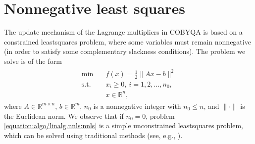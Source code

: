 \documentclass[letterpaper,10pt,english]{sphinxmanual}
\newcommand{\norm}[2][]{#1\lVert#2#1\rVert}
\def\R{\ensuremath{\mathds{R}}}
\begin{document}
\section{Nonnegative least squares}
\label{\detokenize{algo/linalg.nnls:nonnegative-least-squares}}\label{\detokenize{algo/linalg.nnls:linalg-nnls}}\label{\detokenize{algo/linalg.nnls::doc}}
\sphinxAtStartPar
The update mechanism of the Lagrange multipliers in COBYQA is based on a
constrained least\sphinxhyphen{}squares problem, where some variables must remain nonnegative
(in order to satisfy some complementary slackness conditions). The problem we
solve is of the form
\begin{equation}\label{equation:algo/linalg.nnls:nnls}
\begin{split}\begin{array}{ll}
    \min        & \quad f(x) = \frac{1}{2} \norm{Ax - b}^2\\
    \text{s.t.} & \quad x_i \ge 0, ~ i = 1, 2, \dots, n_0,\\
                & \quad x \in \R^n,
\end{array}\end{split}
\end{equation}
\sphinxAtStartPar
where \(A \in \R^{m \times n}\), \(b \in \R^m\), \(n_0\) is a
nonnegative integer with \(n_0 \le n\), and \(\norm{\cdot}\) is the
Euclidean norm. We observe that if \(n_0 = 0\), problem \eqref{equation:algo/linalg.nnls:nnls} is a
simple unconstrained least\sphinxhyphen{}squares problem, which can be solved using
traditional methods (see, e.g., ).
\end{document}
